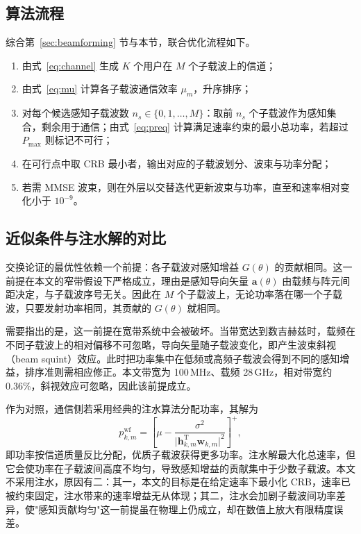 \subsection{算法流程}
\label{sec:selection_alg}

综合第~\ref{sec:beamforming} 节与本节，联合优化流程如下。

\begin{enumerate}
  \item 由式~\eqref{eq:channel} 生成 $K$ 个用户在 $M$ 个子载波上的信道；
  \item 由式~\eqref{eq:mu} 计算各子载波通信效率 $\mu_{m}$，升序排序；
  \item 对每个候选感知子载波数 $n_{s}\in\{0,1,\ldots,M\}$：取前 $n_{s}$ 个子载波作为感知集合，剩余用于通信；由式~\eqref{eq:preq} 计算满足速率约束的最小总功率，若超过 $P_{\max}$ 则标记不可行；
  \item 在可行点中取 CRB 最小者，输出对应的子载波划分、波束与功率分配；
  \item 若需 MMSE 波束，则在外层以交替迭代更新波束与功率，直至和速率相对变化小于 $10^{-9}$。
\end{enumerate}

\subsection{近似条件与注水解的对比}
\label{sec:approx_error}

交换论证的最优性依赖一个前提：各子载波对感知增益 $G(\theta)$ 的贡献相同。这一前提在本文的窄带假设下严格成立，理由是感知导向矢量 $\mathbf{a}(\theta)$ 由载频与阵元间距决定，与子载波序号无关。因此在 $M$ 个子载波上，无论功率落在哪一个子载波，只要发射功率相同，其贡献的 $G(\theta)$ 就相同。

需要指出的是，这一前提在宽带系统中会被破坏。当带宽达到数吉赫兹时，载频在不同子载波上的相对偏移不可忽略，导向矢量随子载波变化，即产生波束斜视（beam squint）效应。此时把功率集中在低频或高频子载波会得到不同的感知增益，排序准则需相应修正。本文带宽为 100\,MHz、载频 28\,GHz，相对带宽约 0.36\%，斜视效应可忽略，因此该前提成立。

作为对照，通信侧若采用经典的注水算法分配功率，其解为
\begin{equation}
  p_{k,m}^{\mathrm{wf}} = \left[\mu - \frac{\sigma^{2}}{\lvert\mathbf{h}_{k,m}^{\mathrm{T}}\mathbf{w}_{k,m}\rvert^{2}}\right]^{+},
  \label{eq:waterfill}
\end{equation}
即功率按信道质量反比分配，优质子载波获得更多功率。注水解最大化总速率，但它会使功率在子载波间高度不均匀，导致感知增益的贡献集中于少数子载波。本文不采用注水，原因有二：其一，本文的目标是在给定速率下最小化 CRB，速率已被约束固定，注水带来的速率增益无从体现；其二，注水会加剧子载波间功率差异，使"感知贡献均匀"这一前提虽在物理上仍成立，却在数值上放大有限精度误差。

